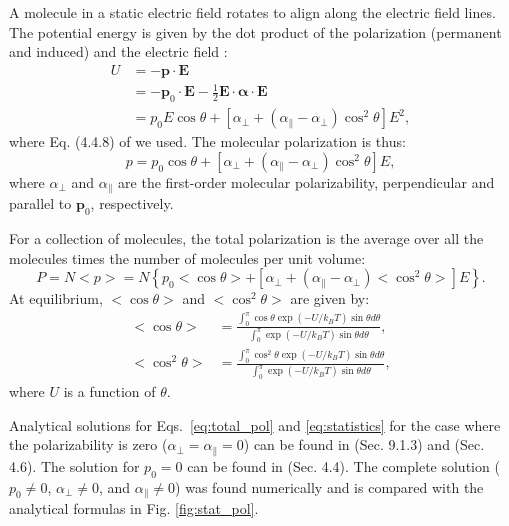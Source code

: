 \documentclass[12pt,letterpaper]{article}
\begin{document}
A molecule in a static electric field rotates to align along the electric field lines. The potential energy is given by the dot product of the polarization (permanent and induced) and the electric field \cite{bonin1997}:
\begin{align}\label{eq:potential}
U &= -\mathbf{p}\cdot\mathbf{E}\nonumber\\
&=-\mathbf{p}_0\cdot\mathbf{E} - \frac{1}{2}\mathbf{E}\cdot\mathbf{\boldsymbol\alpha}\cdot\mathbf{E}\nonumber\\
&= p_0E\cos\theta+\left[\alpha_\bot + (\alpha_\parallel - \alpha_\bot)\cos^2\theta\right]E^2,
\end{align}
where Eq. (4.4.8) of \cite{boyd2008} we used. The molecular polarization is thus:
\begin{equation}\label{eq:single_pol}
 p = p_0\cos\theta+\left[\alpha_\bot + (\alpha_\parallel - \alpha_\bot)\cos^2\theta\right]E,
\end{equation}
where $\alpha_\bot$ and $\alpha_\parallel$ are the first-order molecular polarizability, perpendicular and parallel to $\mathbf{p}_0$, respectively.

For a collection of molecules, the total polarization is the average over all the molecules times the number of molecules per unit volume:
\begin{equation}\label{eq:total_pol}
 P=N<p>=N\left\lbrace p_0<\cos\theta>+\left[\alpha_\bot + (\alpha_\parallel - \alpha_\bot)<\cos^2\theta>\right]E\right\rbrace.
\end{equation}
At equilibrium, $<\cos\theta>$ and $<\cos^2\theta>$ are given by:
\begin{subequations}\label{eq:statistics}
 \begin{align}
  <\cos\theta>&=\frac{\int_0^\pi\cos\theta\exp(-U/k_BT)\sin\theta d\theta}{\int_0^\pi\exp(-U/k_BT)\sin\theta d\theta},\\
  <\cos^2\theta>&=\frac{\int_0^\pi\cos^2\theta\exp(-U/k_BT)\sin\theta d\theta}{\int_0^\pi\exp(-U/k_BT)\sin\theta d\theta},
 \end{align}
\end{subequations}
where $U$ is a function of $\theta$. 

Analytical solutions for Eqs.~\eqref{eq:total_pol} and \eqref{eq:statistics} for the case where the polarizability is zero ($\alpha_\bot = \alpha_\parallel=0$) can be found in \cite{hook1991} (Sec. 9.1.3) and \cite{jackson1999} (Sec. 4.6). The solution for $p_0 = 0$ can be found in \cite{boyd2008} (Sec. 4.4). The complete solution ($p_0\neq 0$, $\alpha_\bot\neq 0$, and $\alpha_\parallel\neq 0$) was found numerically and is compared with the analytical formulas in Fig. \ref{fig:stat_pol}.
\end{document}
